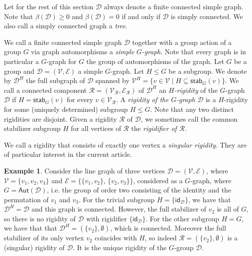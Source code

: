 \documentclass[a4paper,12pt,reqno]{amsart}
\newcommand\mc\mathcal
\theoremstyle{definition}
\newtheorem{ex}[thm]{Example}
\numberwithin{equation}{thm}
\renewcommand{\leq}{\leqslant}
\renewcommand{\geq}{\geqslant}
\begin{document}
Let for the rest of this section $\mc{D}$ always denote a finite connected simple graph. Note that $\beta(\mc{D}) \geq 0$ and 
$\beta(\mc{D}) = 0$ if and only if $\mc{D}$ is simply connected. We also call a simply connected graph a \textit{tree}.


We call a finite connected simple graph $\mathcal{D}$ together with a group action of a group $G$  via graph automorphisms a \textit{simple $G$-graph}.
Note that every graph is in particular a $G$-graph for $G$ the group of automorphisms of the graph.
 Let $G$ be a group and $\mathcal{D}=(\mathcal{V},\mathcal{E})$ a simple $G$-graph.  Let $H \leq G$ be a subgroup. We denote by $\mc{D}^H$ the full subgraph of $\mc{D}$ spanned by $\mc{V}^H=\{v \in \mathcal{V} \mid H \subseteq \mathsf{stab}_G(v)\}$.
We call a connected component $\mathcal{R}=(\mathcal{V}_\mathcal{R},\mathcal{E}_\mathcal{R})$ of $\mathcal{D}^H$ an \textit{$H$-rigidity} of the $G$-graph $\mathcal{D}$ if $H=\mathsf{stab}_G(v)$ for every $v \in \mathcal{V}_\mathcal{R}$. A \textit{rigidity of the $G$-graph $\mathcal{D}$} is a $H$-rigidity for some (uniquely determined) subgroup $H \leq G$. 
Note that any two distinct rigidities are disjoint. Given a rigidity $\mathcal{R}$ of $\mathcal{D}$, we sometimes call the common stabilizer subgroup $H$ for all vertices of $\mathcal{R}$ the \textit{rigidifier of $\mathcal{R}$}.


We call a rigidity that consists of exactly one vertex a  \textit{singular rigidity}. They are of particular interest in the current article.
 

\begin{ex}
Consider the line graph of three vertices $\mathcal{D}=(\mathcal{V}, \mathcal{E})$, where $\mathcal{V}=\{v_1, v_2, v_3\}$ and $\mathcal{E}=\{ \{v_1,v_2\}, \, \{v_2,v_3\}\}$, considered as a $G$-graph, where $G=\mathsf{Aut}(\mathcal{D})$, i.e. the group of order two consisting of the identity and the permutation of $v_1$ and $v_3$. For the trivial subgroup $H=\{\mathsf{id}_\mathcal{D}\}$, we have that $\mathcal{D}^H=\mathcal{D}$ and this graph is connected. However, the full stabilizer of $v_2$ is  all of $G$, so there is no rigidity of $\mathcal{D}$ with rigidifier $\{\mathsf{id}_\mathcal{D}\}$. For the other subgroup $H=G$, we have that that $\mathcal{D}^H=(\{v_2\}, \emptyset)$, which is connected. Moreover the full stabilizer of its only vertex $v_2$ coincides with $H$, so indeed $\mathcal{R}=(\{v_2\}, \emptyset)$ is a (singular) rigidity of $\mathcal{D}$. It is the unique rigidity of the $G$-group $\mathcal{D}$.
\end{ex}
\end{document}
